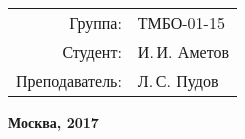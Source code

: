 \begin{titlepage}
\begin{center}

\end{center} %

\vspace{60pt}

	\begin{flushright}
	  \begin{tabular}{rl}
            Группа: & ТМБО-01-15\\
			Студент: & И.\,И. Аметов \\
			Преподаватель: & Л.\,С. Пудов \\
		\end{tabular}
	\end{flushright}

\vfill

	\begin{center} %
		\bfseries
		Москва, 2017
	\end{center}
	
\end{titlepage} 

